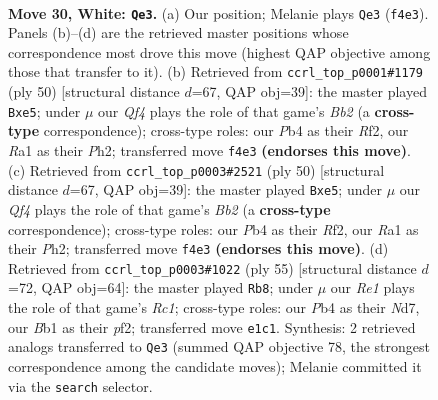\documentclass[11pt]{article}
\begin{document}
\clearpage

\begin{figure}[p]\centering
\begin{subfigure}{0.46\textwidth}\centering
\resizebox{\linewidth}{!}{%
\newchessgame
\chessboard[
  setfen={r2r4/pp3pk1/1q6/7p/bP2PQ2/P5Pp/5P2/RB2R1K1 w - - 1 30},
  showmover=false,
  pgfstyle=straightmove, color=movearrow, markmove={f4-e3}
]}
\caption{}
\end{subfigure}\hfill
\begin{subfigure}{0.46\textwidth}\centering
\resizebox{\linewidth}{!}{%
\newchessgame
\chessboard[
  setfen={r5k1/pb3pp1/1qr4p/4p3/8/1P3PQ1/PB3RPP/1R4K1 w - - 0 26},
  showmover=false,
  pgfstyle=straightmove, color=movearrow, markmove={b2-e5}
]}
\caption{}
\end{subfigure}
\\[4pt]
\begin{subfigure}{0.46\textwidth}\centering
\resizebox{\linewidth}{!}{%
\newchessgame
\chessboard[
  setfen={r5k1/pb3pp1/1qr4p/4p3/8/1P3PQ1/PB3RPP/1R4K1 w - - 0 26},
  showmover=false,
  pgfstyle=straightmove, color=movearrow, markmove={b2-e5}
]}
\caption{}
\end{subfigure}\hfill
\begin{subfigure}{0.46\textwidth}\centering
\resizebox{\linewidth}{!}{%
\newchessgame
\chessboard[
  setfen={2r3k1/r2n1pp1/5q1p/2p5/2Q2P2/4P2P/5PB1/2RR2K1 b - - 0 28},
  showmover=false,
  pgfstyle=straightmove, color=movearrow, markmove={c8-b8}
]}
\caption{}
\end{subfigure}
\caption{\textbf{Move 30, White: \texttt{Qe3}.} (a) Our position; Melanie plays \texttt{Qe3} (\texttt{f4e3}). Panels (b)--(d) are the retrieved master positions whose correspondence most drove this move (highest QAP objective among those that transfer to it). (b) Retrieved from \texttt{ccrl\_top\_p0001\#1179} (ply 50) [structural distance $d$=67, QAP obj=39]: the master played \texttt{Bxe5}; under $\mu$ our \emph{Qf4} plays the role of that game's \emph{Bb2} (a \textbf{cross-type} correspondence); cross-type roles: our \emph{P}b4 as their \emph{R}f2, our \emph{R}a1 as their \emph{P}h2; transferred move \texttt{f4e3} \textbf{(endorses this move)}. (c) Retrieved from \texttt{ccrl\_top\_p0003\#2521} (ply 50) [structural distance $d$=67, QAP obj=39]: the master played \texttt{Bxe5}; under $\mu$ our \emph{Qf4} plays the role of that game's \emph{Bb2} (a \textbf{cross-type} correspondence); cross-type roles: our \emph{P}b4 as their \emph{R}f2, our \emph{R}a1 as their \emph{P}h2; transferred move \texttt{f4e3} \textbf{(endorses this move)}. (d) Retrieved from \texttt{ccrl\_top\_p0003\#1022} (ply 55) [structural distance $d$=72, QAP obj=64]: the master played \texttt{Rb8}; under $\mu$ our \emph{Re1} plays the role of that game's \emph{Rc1}; cross-type roles: our \emph{P}b4 as their \emph{N}d7, our \emph{B}b1 as their \emph{p}f2; transferred move \texttt{e1c1}. Synthesis: 2 retrieved analogs transferred to \texttt{Qe3} (summed QAP objective 78, the strongest correspondence among the candidate moves); Melanie committed it via the \texttt{search} selector.}
\label{fig:thought-m58}
\end{figure}
\end{document}
